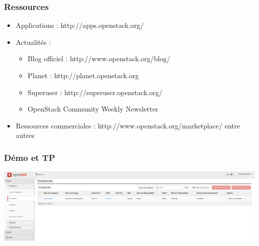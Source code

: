   \begin{frame}
    \frametitle{Ressources}
    \begin{itemize}
      \item Applications : http://apps.openstack.org/
      \item Actualités :
      \begin{itemize}
        \item Blog officiel : http://www.openstack.org/blog/
        \item Planet : http://planet.openstack.org
        \item Superuser : http://superuser.openstack.org/
        \item OpenStack Community Weekly Newsletter
      \end{itemize}
      \item Ressources commerciales : http://www.openstack.org/marketplace/ entre autres
    \end{itemize}
  \end{frame}

  \begin{frame}
    \frametitle{Démo et TP}
    \includegraphics[width=\textwidth]{images/horizon.png}
  \end{frame}


